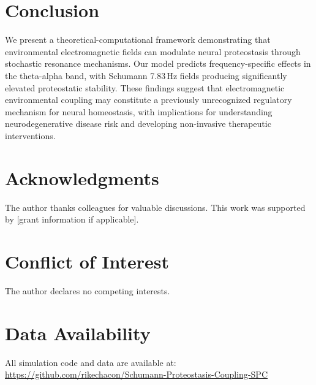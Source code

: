 \documentclass[10pt,a4paper]{article}
\begin{document}
\section{Conclusion}

We present a theoretical-computational framework demonstrating that environmental 
electromagnetic fields can modulate neural proteostasis through stochastic resonance 
mechanisms. Our model predicts frequency-specific effects in the theta-alpha band, 
with Schumann 7.83\,Hz fields producing significantly elevated proteostatic stability. 
These findings suggest that electromagnetic environmental coupling may constitute a 
previously unrecognized regulatory mechanism for neural homeostasis, with implications 
for understanding neurodegenerative disease risk and developing non-invasive therapeutic 
interventions.

\section*{Acknowledgments}

The author thanks colleagues for valuable discussions. This work was supported by 
[grant information if applicable].

\section*{Conflict of Interest}

The author declares no competing interests.

\section*{Data Availability}

All simulation code and data are available at: 
\url{https://github.com/rikechacon/Schumann-Proteostasis-Coupling-SPC}



\end{document}
